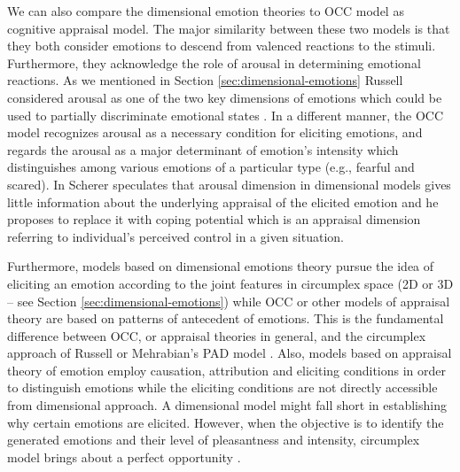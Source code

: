 \documentclass[11pt]{article}
\begin{document}
We can also compare the dimensional emotion theories to OCC model as cognitive
appraisal model. The major similarity between these two models is that they both
consider emotions to descend from valenced reactions to the stimuli.
Furthermore, they acknowledge the role of arousal in determining emotional
reactions. As we mentioned in Section \ref{sec:dimensional-emotions} Russell
considered arousal as one of the two key dimensions of emotions which could be
used to partially discriminate emotional states
\cite{russell:circumplex-affect}. In a different manner, the OCC model
recognizes arousal as a necessary condition for eliciting emotions, and regards
the arousal as a major determinant of emotion’s intensity which distinguishes
among various emotions of a particular type (e.g., fearful and scared). In
\cite{scherer:what-emotions} Scherer speculates that arousal dimension in
dimensional models gives little information about the underlying appraisal of
the elicited emotion and he proposes to replace it with coping potential which
is an appraisal dimension referring to individual’s perceived control in a given
situation. 

Furthermore, models based on dimensional emotions theory pursue the idea of
eliciting an emotion according to the joint features in circumplex space (2D or
3D -- see Section \ref{sec:dimensional-emotions}) while OCC or other
models of appraisal theory are based on patterns of antecedent of emotions. This
is the fundamental difference between OCC, or appraisal theories in general, and the
circumplex approach of Russell \cite{russell:circumplex-affect} or Mehrabian's
PAD model \cite{mehrabian:pad,mehrabian-russell:pad}. Also, models based on
appraisal theory of emotion employ causation, attribution and eliciting
conditions in order to distinguish emotions while the eliciting conditions are
not directly accessible from dimensional approach. A dimensional model might
fall short in establishing why certain emotions are elicited. However, when the
objective is to identify the generated emotions and their level of pleasantness
and intensity, circumplex model brings about a perfect opportunity
\cite{ahmadpour:occ-dimensional-comparison}.
\end{document}
